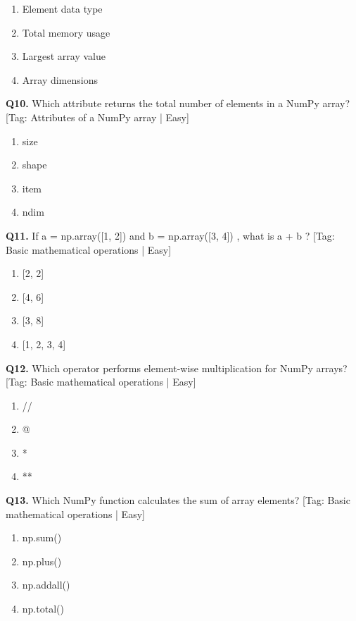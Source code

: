 \begin{enumerate}[label=(\alph*),topsep=2pt,itemsep=1pt,partopsep=0pt,parsep=0pt]
    \item {Element data type}
    \item {Total memory usage}
    \item {Largest array value}
    \item {Array dimensions}
\end{enumerate}
\vspace{2mm}
\noindent\textbf{Q10.} Which attribute returns the total number of elements in a NumPy array? \hfill [Tag: Attributes of a NumPy array | Easy]
\begin{enumerate}[label=(\alph*),topsep=2pt,itemsep=1pt,partopsep=0pt,parsep=0pt]
    \item {size}
    \item {shape}
    \item {item}
    \item {ndim}
\end{enumerate}
\vspace{2mm}
\noindent\textbf{Q11.} If a = np.array([1, 2]) and b = np.array([3, 4]) , what is a + b ? \hfill [Tag: Basic mathematical operations | Easy]
\begin{enumerate}[label=(\alph*),topsep=2pt,itemsep=1pt,partopsep=0pt,parsep=0pt]
    \item {[2, 2]}
    \item {[4, 6]}
    \item {[3, 8]}
    \item {[1, 2, 3, 4]}
\end{enumerate}
\vspace{2mm}
\noindent\textbf{Q12.} Which operator performs element-wise multiplication for NumPy arrays? \hfill [Tag: Basic mathematical operations | Easy]
\begin{enumerate}[label=(\alph*),topsep=2pt,itemsep=1pt,partopsep=0pt,parsep=0pt]
    \item {//}
    \item {@}
    \item {*}
    \item {**}
\end{enumerate}
\vspace{2mm}
\noindent\textbf{Q13.} Which NumPy function calculates the sum of array elements? \hfill [Tag: Basic mathematical operations | Easy]
\begin{enumerate}[label=(\alph*),topsep=2pt,itemsep=1pt,partopsep=0pt,parsep=0pt]
    \item {np.sum()}
    \item {np.plus()}
    \item {np.addall()}
    \item {np.total()}
\end{enumerate}
